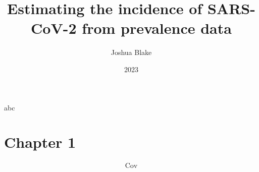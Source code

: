 \documentclass{article}
\title{Estimating the incidence of SARS-CoV-2 from prevalence data}
\author{Joshua Blake}
\date{2023}
\DeclareMathOperator{\cov}{Cov}
\begin{document}
\maketitle
abc
\section{Chapter 1}



\begin{align}
    \cov
\end{align}
\end{document}
